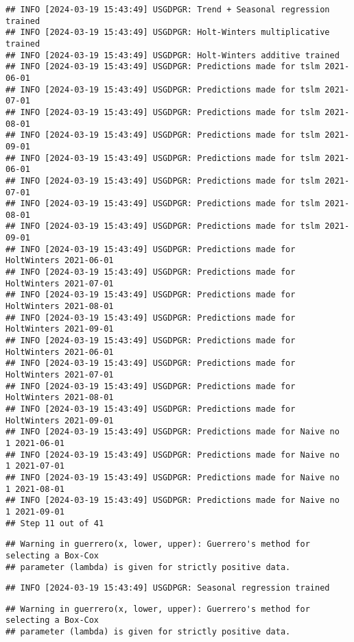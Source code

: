 \documentclass[
]{article}
\begin{document}
\begin{verbatim}
## INFO [2024-03-19 15:43:49] USGDPGR: Trend + Seasonal regression trained
## INFO [2024-03-19 15:43:49] USGDPGR: Holt-Winters multiplicative trained
## INFO [2024-03-19 15:43:49] USGDPGR: Holt-Winters additive trained
## INFO [2024-03-19 15:43:49] USGDPGR: Predictions made for tslm 2021-06-01
## INFO [2024-03-19 15:43:49] USGDPGR: Predictions made for tslm 2021-07-01
## INFO [2024-03-19 15:43:49] USGDPGR: Predictions made for tslm 2021-08-01
## INFO [2024-03-19 15:43:49] USGDPGR: Predictions made for tslm 2021-09-01
## INFO [2024-03-19 15:43:49] USGDPGR: Predictions made for tslm 2021-06-01
## INFO [2024-03-19 15:43:49] USGDPGR: Predictions made for tslm 2021-07-01
## INFO [2024-03-19 15:43:49] USGDPGR: Predictions made for tslm 2021-08-01
## INFO [2024-03-19 15:43:49] USGDPGR: Predictions made for tslm 2021-09-01
## INFO [2024-03-19 15:43:49] USGDPGR: Predictions made for HoltWinters 2021-06-01
## INFO [2024-03-19 15:43:49] USGDPGR: Predictions made for HoltWinters 2021-07-01
## INFO [2024-03-19 15:43:49] USGDPGR: Predictions made for HoltWinters 2021-08-01
## INFO [2024-03-19 15:43:49] USGDPGR: Predictions made for HoltWinters 2021-09-01
## INFO [2024-03-19 15:43:49] USGDPGR: Predictions made for HoltWinters 2021-06-01
## INFO [2024-03-19 15:43:49] USGDPGR: Predictions made for HoltWinters 2021-07-01
## INFO [2024-03-19 15:43:49] USGDPGR: Predictions made for HoltWinters 2021-08-01
## INFO [2024-03-19 15:43:49] USGDPGR: Predictions made for HoltWinters 2021-09-01
## INFO [2024-03-19 15:43:49] USGDPGR: Predictions made for Naive no  1 2021-06-01
## INFO [2024-03-19 15:43:49] USGDPGR: Predictions made for Naive no  1 2021-07-01
## INFO [2024-03-19 15:43:49] USGDPGR: Predictions made for Naive no  1 2021-08-01
## INFO [2024-03-19 15:43:49] USGDPGR: Predictions made for Naive no  1 2021-09-01
## Step 11 out of 41
\end{verbatim}

\begin{verbatim}
## Warning in guerrero(x, lower, upper): Guerrero's method for selecting a Box-Cox
## parameter (lambda) is given for strictly positive data.
\end{verbatim}

\begin{verbatim}
## INFO [2024-03-19 15:43:49] USGDPGR: Seasonal regression trained
\end{verbatim}

\begin{verbatim}
## Warning in guerrero(x, lower, upper): Guerrero's method for selecting a Box-Cox
## parameter (lambda) is given for strictly positive data.
\end{verbatim}
\end{document}
